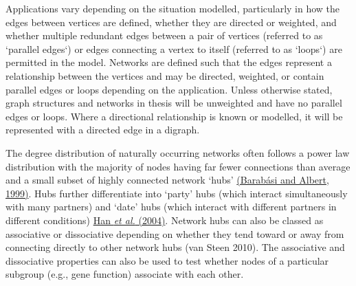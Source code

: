 Applications vary depending on the situation modelled, particularly in how the edges between vertices are defined, whether they are directed or weighted, and whether multiple redundant edges between a pair of vertices (referred to as `parallel edges`) or edges connecting a vertex to itself (referred to as `loops`) are permitted in the model. Networks are defined such that the edges represent a relationship between the vertices and may be directed, weighted, or contain parallel edges or loops depending on the application. Unless otherwise stated, graph structures and networks in thesis will be unweighted and have no parallel edges or loops. Where a directional relationship is known or modelled, it will be represented with a directed edge in a digraph.

The degree distribution of naturally occurring networks often follows a power law distribution with the majority of nodes having far fewer connections than average and a small subset of highly connected network `hubs' \hyperlink{ENREF7}{(Barab\'asi and Albert, 1999)}. Hubs further differentiate into `party' hubs (which interact simultaneously with many partners) and `date' hubs (which interact with different partners in different conditions) \hyperlink{ENREF47}{Han}\hyperlink{ENREF47}{\textit{ et al.}}\hyperlink{ENREF47}{ (2004)}. Network hubs can also be classed as associative or dissociative depending on whether they tend toward or away from connecting directly to other network hubs (van Steen 2010). The associative and dissociative properties can also be used to test whether nodes of a particular subgroup (e.g., gene function) associate with each other. 

